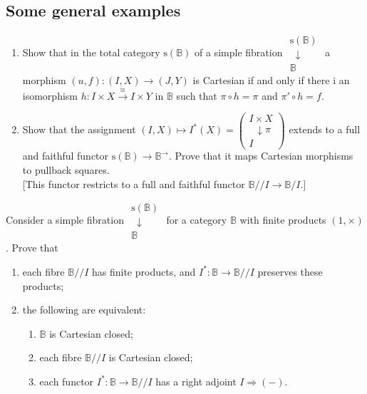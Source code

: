 \documentclass{report}
\newcommand{\bB}[0]{\mathbb B}
\newcommand{\fibcent}[3]{\begin{array}{c}#1 \\[-0.1cm] \;\;\downarrow #2 \\ #3\end{array}}
\newcommand{\rs}[0]{\mathrm{s}}
\newcommand{\dbsl}[0]{/\!\!/}
\begin{document}
\subsection{Some general examples}

\begin{exo}
    \begin{enumerate}[label=(\roman*)]
        \item Show that in the total category $\rs(\bB)$ of a simple fibration $\fibcent{\rs(\bB)}{\;\;}{\bB}$ a morphism $(u,f) : (I,X) \to (J,Y)$ is Cartesian if and only if there i an isomorphism
        $h : I \times X \overset{\cong}{\to} I \times Y$ in $\bB$ such that $\pi\circ h = \pi$ and
        $\pi'\circ h = f$.
        \item Show that the assignment $(I,X)\mapsto I^*(X) = \left(\fibcent{I\times X}{\pi}{I}\right)$
        extends to a full and faithful functor $\rs(\bB)\to\bB^\to$. Prove that it maps Cartesian morphisms
        to pullback squares.\\
        $[$This functor restricts to a full and faithful functor $\bB \dbsl I\to\bB/I$.$]$
    \end{enumerate}
\end{exo}

\begin{exo}
    Consider a simple fibration $\fibcent{\rs(\bB)}{\;\;}{\bB}$ for a category $\bB$ with finite products
    $(1,\times)$. Prove that
    \begin{enumerate}[label=(\roman*)]
        \item each fibre $\bB\dbsl I$ has finite products, and $I^* : \bB\to\bB\dbsl I$ preserves these
        products;
        \item the following are equivalent:
        \begin{enumerate}[label=(\alph*)]
            \item $\bB$ is Cartesian closed;
            \item each fibre $\bB\dbsl I$ is Cartesian closed;
            \item each functor $I^* : \bB\to \bB\dbsl I$ has a right adjoint $ I \Rightarrow (-)$.
        \end{enumerate}
    \end{enumerate}
\end{exo}
\end{document}
